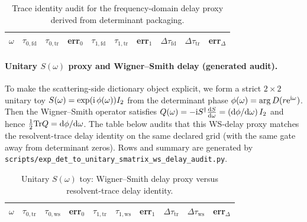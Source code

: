 \begin{table}[t]
\centering
\scriptsize
\setlength{\tabcolsep}{6pt}
\renewcommand{\arraystretch}{1.15}
\begin{tabular}{r r r r r r r r r r}
\toprule
$\omega$ & $\tau_{0,\mathrm{fd}}$ & $\tau_{0,\mathrm{tr}}$ & err$_0$
& $\tau_{1,\mathrm{fd}}$ & $\tau_{1,\mathrm{tr}}$ & err$_1$
& $\Delta\tau_{\mathrm{fd}}$ & $\Delta\tau_{\mathrm{tr}}$ & err$_\Delta$ \\
\midrule

\end{tabular}
\caption{Trace identity audit for the frequency-domain delay proxy derived from determinant packaging.}
\label{tab:det_phase_delay_trace_identity_audit}
\end{table}

%

\paragraph{Unitary $S(\omega)$ proxy and Wigner--Smith delay (generated audit).}
\AuditTag To make the scattering-side dictionary object explicit, we form a strict $2\times2$ unitary toy
$S(\omega)=\exp(\mathrm{i}\,\phi(\omega))I_2$ from the determinant phase $\phi(\omega)=\arg D(r\mathrm{e}^{\mathrm{i}\omega})$.
Then the Wigner--Smith operator satisfies $Q(\omega)=-\mathrm{i} S^\dagger \frac{\mathrm{d} S}{\mathrm{d}\omega}=(\mathrm{d}\phi/\mathrm{d}\omega)\,I_2$ and hence $\tfrac12\mathrm{Tr} Q=\mathrm{d}\phi/\mathrm{d}\omega$.
The table below audits that this WS-delay proxy matches the resolvent-trace delay identity on the same declared grid (with the same gate away from determinant zeros).
Rows and summary are generated by \texttt{scripts/exp\_det\_to\_unitary\_smatrix\_ws\_delay\_audit.py}.

\begin{table}[t]
\centering
\scriptsize
\setlength{\tabcolsep}{6pt}
\renewcommand{\arraystretch}{1.15}
\begin{tabular}{r r r r r r r r r r}
\toprule
$\omega$ & $\tau_{0,\mathrm{tr}}$ & $\tau_{0,\mathrm{ws}}$ & err$_0$
& $\tau_{1,\mathrm{tr}}$ & $\tau_{1,\mathrm{ws}}$ & err$_1$
& $\Delta\tau_{\mathrm{tr}}$ & $\Delta\tau_{\mathrm{ws}}$ & err$_\Delta$ \\
\midrule

\end{tabular}
\caption{Unitary $S(\omega)$ toy: Wigner--Smith delay proxy versus resolvent-trace delay identity.}
\label{tab:det_to_smatrix_ws_delay_audit}
\end{table}

